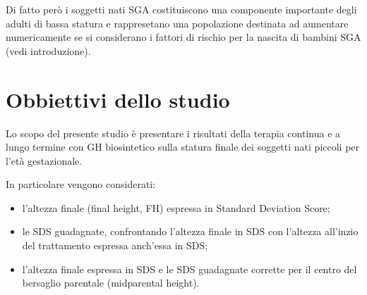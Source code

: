 Di fatto però i soggetti nati SGA costituiscono una componente importante degli adulti di bassa statura e rappresetano una popolazione destinata ad aumentare numericamente se si considerano i fattori di rischio per la nascita di bambini SGA (vedi introduzione).
 
 





\section{Obbiettivi dello studio}

Lo scopo del presente studio è presentare i risultati della terapia continua e a lungo termine  con GH biosintetico sulla statura finale dei soggetti nati piccoli per l'età gestazionale.

In particolare vengono considerati:

\begin{itemize}
\item l'altezza finale (final height, FH) espressa in Standard Deviation Score;
\item le SDS guadagnate, confrontando l'altezza finale in SDS con l'altezza all'inzio del trattamento espressa anch'essa in SDS;
\item l'altezza finale espressa in SDS e le SDS guadagnate corrette per il centro del bersaglio parentale (midparental height).
\end{itemize}



